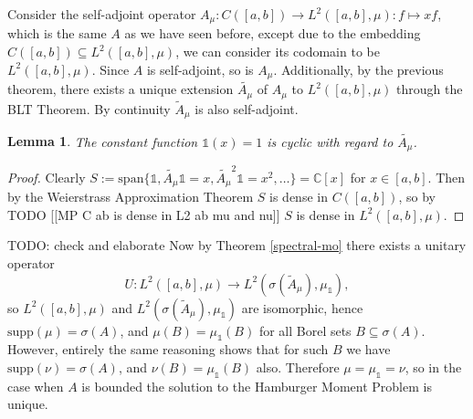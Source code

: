 \documentclass[12pt,oneside]{report}
\newtheorem{lem}[thm]{Lemma}
\begin{document}
Consider the self-adjoint operator $A_{\mu}: C([a,b]) \to L^{2}([a,b],\mu): f \mapsto xf$, which is the same $A$ as we have seen before, except due to the embedding $C([a,b]) \subseteq L^{2}([a,b],\mu)$, we can consider its codomain to be $L^{2}([a,b],\mu)$. Since $A$ is self-adjoint, so is $A_{\mu}$. Additionally, by the previous theorem, there exists a unique extension $\tilde{A_{\mu}}$ of $A_{\mu}$ to $L^{2}([a,b],\mu)$ through the BLT Theorem. By continuity $\tilde{A}_{\mu}$ is also self-adjoint.

\begin{lem}
    The constant function $\mathds{1}(x) = 1$ is cyclic with regard to $\tilde{A_{\mu}}$.
\end{lem}
\begin{proof}
    Clearly $S := \text{span}\{ \mathds{1}, \tilde{A_{\mu}}\mathds{1} = x, \tilde{A_{\mu}}^{2}\mathds{1} = x^{2}, \dots \} = \mathbb{C}[x]$ for $x \in [a,b]$. Then by the Weierstrass Approximation Theorem $S$ is dense in $C([a,b])$, so by TODO [[MP C ab is dense in L2 ab mu and nu]] $S$ is dense in $L^{2}([a,b],\mu)$.
\end{proof}

TODO: check and elaborate Now by Theorem \ref{spectral-mo} there exists a unitary operator $$U: L^2([a,b],\mu) \to L^2(\sigma(\tilde{A}_\mu), \mu_\mathds{1}),$$ so $L^2([a,b],\mu)$ and $L^2(\sigma(\tilde{A}_\mu), \mu_\mathds{1})$ are isomorphic, hence $\text{supp}(\mu) = \sigma(A)$, and $\mu(B) = \mu_\mathds{1}(B)$ for all Borel sets $B \subseteq \sigma(A)$. However, entirely the same reasoning shows that for such $B$ we have $\text{supp}(\nu) = \sigma(A)$, and $\nu(B) = \mu_\mathds{1}(B)$ also. Therefore $\mu = \mu_\mathds{1} = \nu$, so in the case when $A$ is bounded the solution to the Hamburger Moment Problem is unique.

\end{document}

